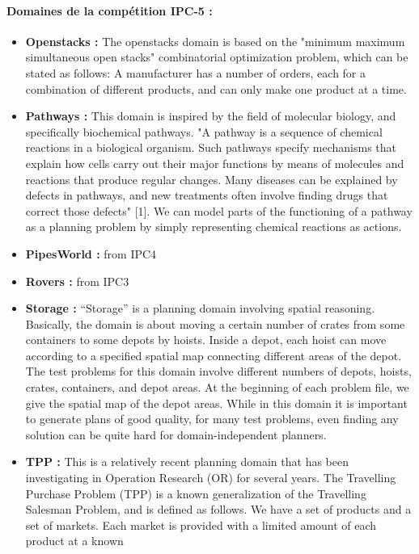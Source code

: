 \paragraph*{Domaines de la compétition IPC-5 :}
\begin{itemize}
\item \textbf{Openstacks :}
{\color{red}The openstacks domain is based on the "minimum maximum simultaneous open
stacks" combinatorial optimization problem, which can be stated as follows: 
A manufacturer has a number of orders, each for a combination of different 
products, and can only make one product at a time.}
\item \textbf{Pathways :}
{\color{red}This domain is inspired by the field of molecular biology, and specifically 
biochemical pathways. "A pathway is a sequence of chemical reactions in a
biological organism. Such pathways specify mechanisms that explain how
cells carry out their major functions by means of molecules and reactions
that produce regular changes. Many diseases can be explained by defects 
in pathways, and new treatments often involve finding drugs that correct
those defects" [1]. We can model parts of the functioning of a pathway as
a planning problem by simply representing chemical reactions as actions.}
\item \textbf{PipesWorld :}
{\color{red}from IPC4}
\item \textbf{Rovers :}
{\color{red}from IPC3}
\item \textbf{Storage :}
{\color{red}\enquote{Storage} is a planning domain involving spatial reasoning. Basically, the
domain is about moving a certain number of crates from some containers to
some depots by hoists. Inside a depot, each hoist can move according to a
specified spatial map connecting different areas of the depot. The test
problems for this domain involve different numbers of depots, hoists,
crates, containers, and depot areas. At the beginning of each problem
file, we give the spatial map of the depot areas. While in this domain it
is important to generate plans of good quality, for many test problems,
even finding any solution can be quite hard for domain-independent
planners.}
\item \textbf{TPP :}
{\color{red}This is a relatively recent planning domain that has been investigating in
Operation Research (OR) for several years. The Travelling Purchase Problem
(TPP) is a known generalization of the Travelling Salesman Problem, and is
defined as follows. We have a set of products and a set of markets. Each
market is provided with a limited amount of each product at a known
}
\end{itemize}
